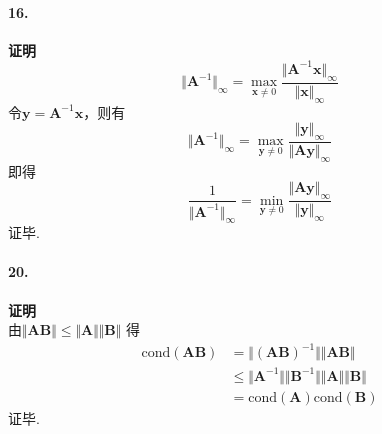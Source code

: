\paragraph{16.} \textbf{证明} \\
\[\Vert\mathbf{A}^{-1}\Vert_{\infty} = \max_{\mathbf{x} \ne 0} \frac{\Vert \mathbf{A}^{-1}\mathbf{x}\Vert_{\infty}}{\Vert \mathbf{x} \Vert_{\infty}}\]
令$\mathbf{y} = \mathbf{A}^{-1}\mathbf{x}$，则有
\[\Vert\mathbf{A}^{-1}\Vert_{\infty} = \max_{\mathbf{y} \ne 0} \frac{\Vert \mathbf{y}\Vert_{\infty}}{\Vert \mathbf{Ay} \Vert_{\infty}}\]
即得
\[\frac{1}{\Vert\mathbf{A}^{-1}\Vert_{\infty}} = \min_{\mathbf{y} \ne 0} \frac{\Vert \mathbf{Ay}\Vert_{\infty}}{\Vert \mathbf{y} \Vert_{\infty}}\]
证毕.
\newline

\paragraph{20.} \textbf{证明} \\
由$\Vert \mathbf{AB} \Vert \le \Vert \mathbf{A} \Vert \Vert \mathbf{B} \Vert$ 得
\[\begin{split}
\mathrm{cond}(\mathbf{AB}) & = \Vert (\mathbf{AB})^{-1} \Vert \Vert \mathbf{AB} \Vert \\
& \le \Vert \mathbf{A}^{-1} \Vert \Vert \mathbf{B}^{-1} \Vert \Vert \mathbf{A} \Vert \Vert \mathbf{B} \Vert \\
& = \mathrm{cond}(\mathbf{A})\mathrm{cond}(\mathbf{B})
\end{split}\]
证毕.

